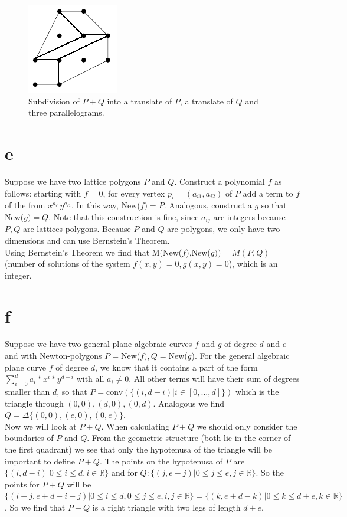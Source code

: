 \documentclass[paper=a4, fontsize=11pt]{scrartcl} %
\theoremstyle{plain}
\begin{document}
\begin{figure}[htbp]
   \centering
   \includegraphics{Images/LatticeDivision.png} %
   \caption{Subdivision of $P+Q$ into a translate of $P$, a translate of $Q$ and three parallelograms.}
   \label{fig:ls}
\end{figure}

\section{e}
Suppose we have two lattice polygons $P$ and $Q$. Construct a polynomial $f$ as follows: starting with $f=0$, for every vertex $p_{i} = (a_{i1},a_{i2})$ of $P$ add a term to $f$ of the from $x^{a_{i1}}y^{a_{i2}}$. In this way, New($f) = P$. Analogous, construct a $g$ so that New($g)=Q$. Note that this construction is fine, since $a_{ij}$ are integers because $P,Q$ are lattices polygons. Because $P$ and $Q$ are polygons, we only have two dimensions and can use Bernstein's Theorem.\\
Using Bernstein's Theorem we find that M(New($f$),New($g)) = M(P,Q)= $ (number of solutions of the system $f(x,y)=0,g(x,y)=0$), which is an integer. 

\section{f}
Suppose we have two general plane algebraic curves $f$ and $g$ of degree $d$ and $e$ and with Newton-polygons $P=$New($f), Q=$New($g$). For the general algebraic plane curve $f$ of degree $d$, we know that it contains a part of the form $\sum_{i=0}^{d}a_{i}*x^{i}*y^{d-i}$ with all $a_{i}\neq 0$. All other terms will have their sum of degrees smaller than $d$, so that $P=$conv$(\{(i,d-i)| i\in [0,\ldots,d]\})$ which is the triangle through $(0,0),(d,0),(0,d)$. Analogous we find $Q=\Delta\{(0,0),(e,0),(0,e)\}$.\\

Now we will look at $P+Q$. When calculating $P+Q$ we should only consider the boundaries of $P$ and $Q$. From the geometric structure (both lie in the corner of the first quadrant) we see that only the hypotenusa of the triangle will be important to define $P+Q$. The points on the hypotenusa of $P$ are $\{(i,d-i)| 0\leq i\leq d, i\in \mathbb{R}\}$ and for $Q: \{(j,e-j)| 0\leq j\leq e, j \in \mathbb{R}\}$. So the points for $P+Q$ will be $\{(i+j,e+d-i-j) | 0\leq i\leq d, 0\leq j \leq e, i,j\in \mathbb{R}\} = \{(k,e+d-k) | 0\leq k\leq d+e, k\in \mathbb{R}\}$. So we find that $P+Q$ is a right triangle with two legs of length $d+e$. 
\end{document}
